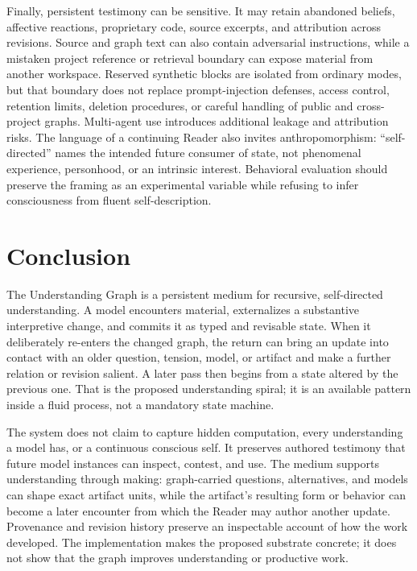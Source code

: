 Finally, persistent testimony can be sensitive. It may retain abandoned beliefs, affective reactions, proprietary code, source excerpts, and attribution across revisions. Source and graph text can also contain adversarial instructions, while a mistaken project reference or retrieval boundary can expose material from another workspace. Reserved synthetic blocks are isolated from ordinary modes, but that boundary does not replace prompt-injection defenses, access control, retention limits, deletion procedures, or careful handling of public and cross-project graphs. Multi-agent use introduces additional leakage and attribution risks. The language of a continuing Reader also invites anthropomorphism: ``self-directed'' names the intended future consumer of state, not phenomenal experience, personhood, or an intrinsic interest. Behavioral evaluation should preserve the framing as an experimental variable while refusing to infer consciousness from fluent self-description.

\section{Conclusion}

The Understanding Graph is a persistent medium for recursive, self-directed understanding. A model encounters material, externalizes a substantive interpretive change, and commits it as typed and revisable state. When it deliberately re-enters the changed graph, the return can bring an update into contact with an older question, tension, model, or artifact and make a further relation or revision salient. A later pass then begins from a state altered by the previous one. That is the proposed understanding spiral; it is an available pattern inside a fluid process, not a mandatory state machine.

The system does not claim to capture hidden computation, every understanding a model has, or a continuous conscious self. It preserves authored testimony that future model instances can inspect, contest, and use. The medium supports understanding through making: graph-carried questions, alternatives, and models can shape exact artifact units, while the artifact's resulting form or behavior can become a later encounter from which the Reader may author another update. Provenance and revision history preserve an inspectable account of how the work developed. The implementation makes the proposed substrate concrete; it does not show that the graph improves understanding or productive work.

